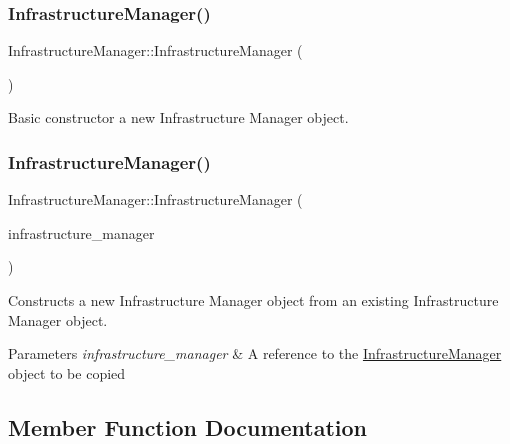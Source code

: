 \subsubsection{\texorpdfstring{Infrastructure\+Manager()}{InfrastructureManager()}\hspace{0.1cm}{\footnotesize\ttfamily [2/3]}}
{\footnotesize\ttfamily Infrastructure\+Manager\+::\+Infrastructure\+Manager (\begin{DoxyParamCaption}{ }\end{DoxyParamCaption})}



Basic constructor a new Infrastructure Manager object. 

\mbox{\label{classInfrastructureManager_a9d1fe6a0325a3705dbfabb92afbe9055}} 
\subsubsection{\texorpdfstring{Infrastructure\+Manager()}{InfrastructureManager()}\hspace{0.1cm}{\footnotesize\ttfamily [3/3]}}
{\footnotesize\ttfamily Infrastructure\+Manager\+::\+Infrastructure\+Manager (\begin{DoxyParamCaption}\item[{\mbox{\hyperlink{classInfrastructureManager}{Infrastructure\+Manager}} \&}]{infrastructure\+\_\+manager }\end{DoxyParamCaption})}



Constructs a new Infrastructure Manager object from an existing Infrastructure Manager object. 


\begin{DoxyParams}{Parameters}
{\em infrastructure\+\_\+manager} & A reference to the \mbox{\hyperlink{classInfrastructureManager}{Infrastructure\+Manager}} object to be copied \\
\hline
\end{DoxyParams}


\subsection{Member Function Documentation}
\mbox{\label{classInfrastructureManager_a3950df03bc8fd5743aefeca4c3d7bf98}} 
